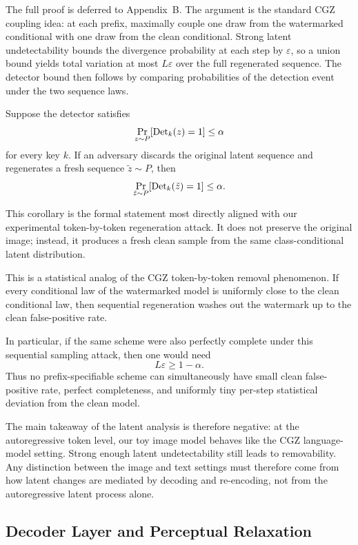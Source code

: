\documentclass[12pt]{article}
\begin{document}
The full proof is deferred to Appendix~B. The argument is the standard
CGZ coupling idea: at each prefix, maximally couple one draw from the
watermarked conditional with one draw from the clean conditional.
Strong latent undetectability bounds the divergence probability at each
step by $\varepsilon$, so a union bound yields total variation at most
$L\varepsilon$ over the full regenerated sequence. The detector bound
then follows by comparing probabilities of the detection event under the
two sequence laws.

\begin{corollary}
Suppose the detector satisfies
\[
\Prob[z\sim P]{\mathrm{Det}_k(z)=1}\le \alpha
\]
for every key $k$. If an adversary discards the original latent
sequence and regenerates a fresh sequence $\tilde z\sim P$, then
\[
\Prob[\tilde z\sim P]{\mathrm{Det}_k(\tilde z)=1}\le \alpha.
\]
\end{corollary}

This corollary is the formal statement most directly aligned with our
experimental token-by-token regeneration attack. It does not preserve
the original image; instead, it produces a fresh clean sample from the
same class-conditional latent distribution.

This is a statistical analog of the CGZ token-by-token removal
phenomenon. If every conditional law of the watermarked model is
uniformly close to the clean conditional law, then sequential
regeneration washes out the watermark up to the clean false-positive
rate.

In particular, if the same scheme were also perfectly complete under
this sequential sampling attack, then one would need
\[
L\varepsilon \ge 1-\alpha.
\]
Thus no prefix-specifiable scheme can simultaneously have small clean
false-positive rate, perfect completeness, and uniformly tiny per-step
statistical deviation from the clean model.

The main takeaway of the latent analysis is therefore negative: at the
autoregressive token level, our toy image model behaves like the CGZ
language-model setting. Strong enough latent undetectability still leads
to removability. Any distinction between the image and text settings
must therefore come from how latent changes are mediated by decoding and
re-encoding, not from the autoregressive latent process alone.

\subsection{Decoder Layer and Perceptual Relaxation}
\end{document}
